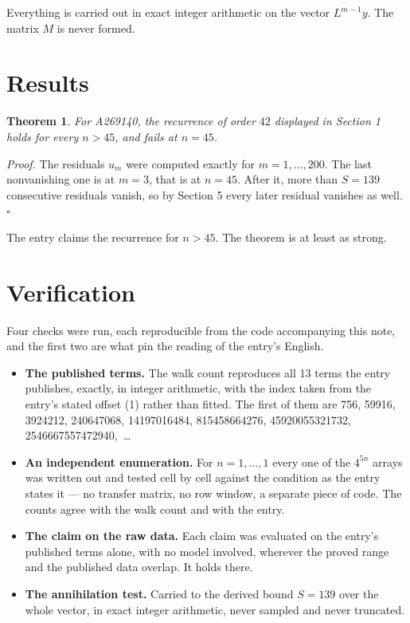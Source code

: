 \documentclass[11pt]{article}
\newtheorem{theorem}{Theorem}
\theoremstyle{definition}
\begin{document}
Everything is carried out in exact integer arithmetic on the vector $L^{m-1}y$. The matrix $M$ is never formed.

\section{Results}

\begin{theorem} For A269140, the recurrence of order $42$ displayed in Section 1 holds for every $n > 45$, and fails at $n = 45$.\end{theorem}

{\itshape Proof.} The residuals $u_m$ were computed exactly for $m = 1,\dots,200$. The last nonvanishing one is at $m = 3$, that is at $n = 45$. After it, more than $S = 139$ consecutive residuals vanish, so by Section 5 every later residual vanishes as well. $\square$

The entry claims the recurrence for $n > 45$. The theorem is at least as strong.

\section{Verification}

Four checks were run, each reproducible from the code accompanying this note, and the first two are what pin the reading of the entry's English.

\begin{itemize}

\item {\bfseries The published terms.} The walk count reproduces all 13 terms the entry publishes, exactly, in integer arithmetic, with the index taken from the entry's stated offset (1) rather than fitted. The first of them are 756, 59916, 3924212, 240647068, 14197016484, 815458664276, 45920055321732, 2546667557472940,~\dots

\item {\bfseries An independent enumeration.} For $n = 1,\dots,1$ every one of the $4^{5n}$ arrays was written out and tested cell by cell against the condition as the entry states it --- no transfer matrix, no row window, a separate piece of code. The counts agree with the walk count and with the entry.

\item {\bfseries The claim on the raw data.} Each claim was evaluated on the entry's published terms alone, with no model involved, wherever the proved range and the published data overlap. It holds there.

\item {\bfseries The annihilation test.} Carried to the derived bound $S = 139$ over the whole vector, in exact integer arithmetic, never sampled and never truncated.

\end{itemize}
\end{document}
